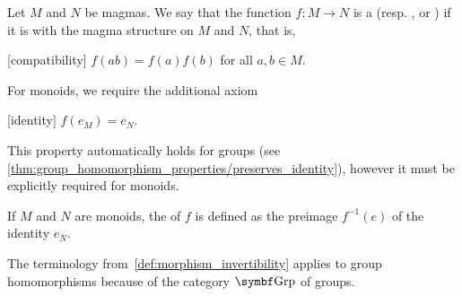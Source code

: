 \begin{definition}\label{def:magma_homomorphism}
  Let \( M \) and \( N \) be magmas. We say that the function \( f: M \to N \) is a  (resp. , or ) if it is  with the magma structure on \( M \) and \( N \), that is,
  \begin{description}
    [compatibility] \( f(ab) = f(a) f(b) \) for all \( a, b \in M \).
  \end{description}

  For monoids, we require the additional axiom
  \begin{description}
    [identity] \( f(e_M) = e_N \).
  \end{description}

  This property automatically holds for groups (see \cref{thm:group_homomorphism_properties/preserves_identity}), however it must be explicitly required for monoids.

  If \( M \) and \( N \) are monoids, the  of \( f \) is defined as the preimage \( f^{-1}(e) \) of the identity \( e_N \).

  The terminology from~\cref{def:morphism_invertibility} applies to group homomorphisms because of the category \( \Bold{Grp} \) of groups.
\end{definition}

